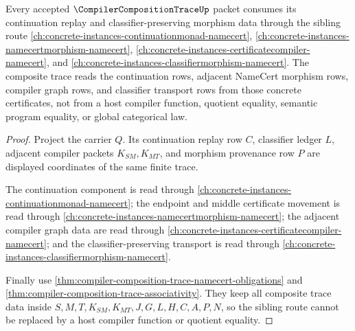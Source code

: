 \begin{theorem}
\label{thm:compiler-composition-trace-continuationmonad-sibling-route}
Every accepted $\CompilerCompositionTraceUp$ packet consumes its continuation replay and classifier-preserving morphism data through the sibling route
\autoref{ch:concrete-instances-continuationmonad-namecert},
\autoref{ch:concrete-instances-namecertmorphism-namecert},
\autoref{ch:concrete-instances-certificatecompiler-namecert}, and
\autoref{ch:concrete-instances-classifiermorphism-namecert}. The composite trace reads the continuation rows, adjacent NameCert morphism rows, compiler graph rows, and classifier transport rows from those concrete certificates, not from a host compiler function, quotient equality, semantic program equality, or global categorical law.
\end{theorem}
\begin{proof}
Project the carrier $Q$. Its continuation replay row $C$, classifier ledger $L$, adjacent compiler packets $K_{SM},K_{MT}$, and morphism provenance row $P$ are displayed coordinates of the same finite trace.

The continuation component is read through \autoref{ch:concrete-instances-continuationmonad-namecert}; the endpoint and middle certificate movement is read through \autoref{ch:concrete-instances-namecertmorphism-namecert}; the adjacent compiler graph data are read through \autoref{ch:concrete-instances-certificatecompiler-namecert}; and the classifier-preserving transport is read through \autoref{ch:concrete-instances-classifiermorphism-namecert}.

Finally use \autoref{thm:compiler-composition-trace-namecert-obligations} and \autoref{thm:compiler-composition-trace-associativity}. They keep all composite trace data inside $S,M,T,K_{SM},K_{MT},J,G,L,H,C,A,P,N$, so the sibling route cannot be replaced by a host compiler function or quotient equality.
\end{proof}


